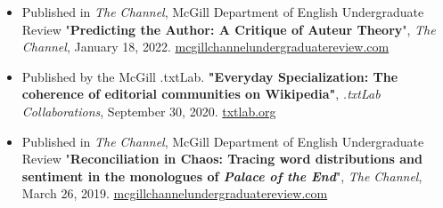 \begin{itemize}
    \item  Published in \textit{The Channel}, McGill Department of English Undergraduate
          Review "\textbf{Predicting the Author: A Critique of Auteur Theory}",
          \textit{The Channel}, January 18, 2022.
          \href{http://mcgillchannelundergraduatereview.com/2022/01/predicting-the-author-a-critique-of-auteur-theory//}{mcgillchannelundergraduatereview.com}
\end{itemize}
\begin{itemize}
    \item Published by the McGill .txtLab. \textbf{"Everyday Specialization: The
              coherence of editorial communities on Wikipedia"}, \textit{.txtLab
              Collaborations}, September 30, 2020.
          \href{https://txtlab.org/2020/09/do-wikipedia-editors-specialize/}{txtlab.org}
\end{itemize}
\begin{itemize}
    \item  Published in \textit{The Channel}, McGill Department of English Undergraduate
          Review "\textbf{Reconciliation in Chaos: Tracing word distributions and
              sentiment in the monologues of \textit{Palace of the End}}", \textit{The
              Channel}, March 26, 2019.
          \href{http://mcgillchannelundergraduatereview.com/2019/03/reconciliation-in-chaos-tracing-word-distributions-and-sentiment-in-the-monologues-of-palace-of-the-end/}{mcgillchannelundergraduatereview.com}
\end{itemize}

